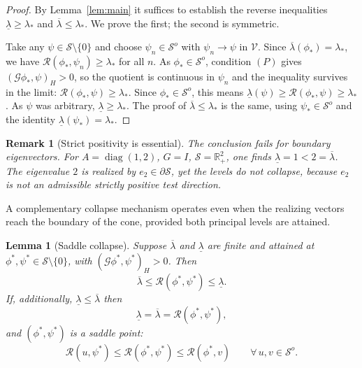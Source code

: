 \documentclass[10pt,a4paper]{amsart}
\newtheorem{lemma}{Lemma}
\newtheorem{remark}{Remark}
\begin{document}
\begin{proof}
	By Lemma~\ref{lem:main} it suffices to establish the reverse inequalities
	$\underline{\lambda}\geq\lambda_{*}$ and $\overline{\lambda}\leq\lambda_{*}$.
	We prove the first; the second is symmetric.
	
	Take any $\psi\in\mathcal{S}\setminus\{0\}$ and choose
	$\psi_{n}\in\mathcal{S}^{o}$ with $\psi_{n}\to\psi$ in $\mathcal{V}$.
	Since $\overline{\lambda}(\phi_{*})=\lambda_{*}$, we have
	$\mathcal{R}(\phi_{*},\psi_{n})\geq\lambda_{*}$ for all $n$. As
	$\phi_{*}\in\mathcal{S}^{o}$, condition $(P)$ gives
	$(\mathcal{G}\phi_{*},\psi)_{H}>0$, so the quotient is continuous in
	$\psi_{n}$ and the inequality survives in the limit:
	$\mathcal{R}(\phi_{*},\psi)\geq\lambda_{*}$. Since
	$\phi_{*}\in\mathcal{S}^{o}$, this means
	$\underline{\lambda}(\psi)\geq\mathcal{R}(\phi_{*},\psi)\geq\lambda_{*}$.
	As $\psi$ was arbitrary, $\underline{\lambda}\geq\lambda_{*}$.
	The proof of $\overline{\lambda}\le\lambda_{*}$ is the same, using
	$\psi_{*}\in\mathcal S^o$ and the identity
	$\underline{\lambda}(\psi_{*})=\lambda_{*}$.
\end{proof}

\begin{remark}[Strict positivity is essential]
	The conclusion fails for boundary eigenvectors. For
	$A=\operatorname{diag}(1,2)$, $G=I$, $\mathcal{S}=\mathbb{R}_{+}^{2}$, one
	finds $\underline{\lambda}=1<2=\overline{\lambda}$. The eigenvalue $2$ is
	realized by $e_{2}\in\partial\mathcal{S}$, yet the levels do not collapse,
	because $e_{2}$ is not an admissible strictly positive test direction.
\end{remark}

A complementary collapse mechanism operates even when the realizing vectors
reach the boundary of the cone, provided both principal levels are attained.

\begin{lemma}[Saddle collapse]\label{lem:saddle-collapse}
	Suppose $\overline{\lambda}$ and $\underline{\lambda}$ are finite and attained
	at $\phi^{*},\psi^{*}\in\mathcal{S}\setminus\{0\}$, with
	$(\mathcal{G}\phi^{*},\psi^{*})_{H}>0$. Then
	\[
	\overline{\lambda}
	\leq \mathcal{R}(\phi^{*},\psi^{*})
	\leq \underline{\lambda}.
	\]
	If, additionally, $\underline{\lambda}\leq\overline{\lambda}$ then
	\[
	\underline{\lambda}
	= \overline{\lambda}
	= \mathcal{R}(\phi^{*},\psi^{*}),
	\]
	and $(\phi^{*},\psi^{*})$ is a saddle point:
	\[
	\mathcal{R}(u,\psi^{*})
	\leq \mathcal{R}(\phi^{*},\psi^{*}) \leq
	\mathcal{R}(\phi^{*},v)
	\qquad \forall\,u,v\in\mathcal{S}^{o}.
	\]
\end{lemma}
\end{document}
